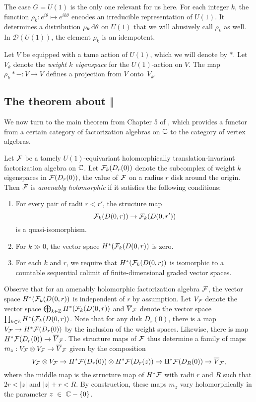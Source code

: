 The case $G = U(1)$ is the only one relevant for us here. 
For each integer $k$, the function $\rho_k: e^{i\theta} \mapsto e^{ik\theta}$ encodes an irreducible representation of $U(1)$.
It determines a distribution $\rho_k \, {\rm d} \theta$ on $U(1)$ that we will abusively call $\rho_k$ as well.
In $\mathcal{D}(U(1))$, the element $\rho_k$  is an idempotent.

\begin{dfn}
Let $V$ be equipped with a tame action of $U(1)$, which we will denote by $\ast$. 
Let $V_k$ denote the {\em weight $k$ eigenspace} for the $U(1)$-action on $V$.
The map $\rho_k \ast - : V \to V$ defines a projection from $V$ onto~$V_k$. 
\end{dfn}

\subsection{The theorem about $\Vert$}

We now turn to the main theorem from Chapter 5 of \cite{CG}, 
which provides a functor from a certain category of factorization algebras on $\mathbb C$ to the category of vertex algebras.

\begin{dfn}
Let $\mathcal F$ be a tamely $U(1)$-equivariant holomorphically translation-invariant factorization algebra on $\mathbb C$.
Let $\mathcal F_k(D_r(0))$ denote the subcomplex of weight $k$ eigenspaces in $\mathcal F(D_r(0))$, 
the value of $\mathcal F$ on a radius $r$ disk around the origin.
Then $\mathcal F$ is {\em amenably holomorphic} if it satisfies the following conditions:
\begin{enumerate}
\item 
For every pair of radii $r < r'$, the structure map
$$
\mathcal F_k(D(0,r)) \to \mathcal F_k(D(0,r'))
$$
is a quasi-isomorphism.
\item For $k \gg 0$, the vector space $H^\ast (\mathcal F_k(D(0,r))$ is zero.  
\item For each $k$ and $r$, we require that $H^\ast(\mathcal F_k(D(0,r) )$ is isomorphic to a countable sequential colimit of finite-dimensional graded vector spaces. 
\end{enumerate}
\end{dfn}

Observe that for an amenably holomorphic factorization algebra $\mathcal F$, 
the vector space $H^* (\mathcal F_k(D(0,r))$ is independent of $r$ by assumption.
Let $V_\mathcal F$ denote the vector space $\bigoplus_{k \in \mathbb Z} H^* (\mathcal F_k(D(0,r))$
and $\overline{V}_\mathcal F$ denote the vector space $\prod_{k \in \mathbb Z} H^* (\mathcal F_k(D(0,r))$.
Note that for any disk $D_r(0)$, there is a map $V_\mathcal F \to H^*\mathcal F(D_r(0))$ by the inclusion of the weight spaces.
Likewise, there is map $H^*\mathcal F(D_r(0)) \to \overline{V}_\mathcal F$.
The structure maps of $\mathcal F$ thus determine a family of maps $m_z: V_\mathcal F \otimes V_\mathcal F \to \overline{V}_\mathcal F$ 
given by the composition
\[
V_\mathcal F \otimes V_\mathcal F \to H^*\mathcal F(D_r(0)) \otimes H^* \mathcal F(D_r(z)) \to {\rm H}^*\mathcal F(D_R(0)) \to \overline{V}_\mathcal F,
\]
where the middle map is the structure map of $H^* \mathcal F$ with radii $r$ and $R$ such that $2r < |z|$ and $|z| + r < R$.
By construction, these maps $m_z$ vary holomorphically in the parameter $z~\in~\mathbb C-\{0\}$.

